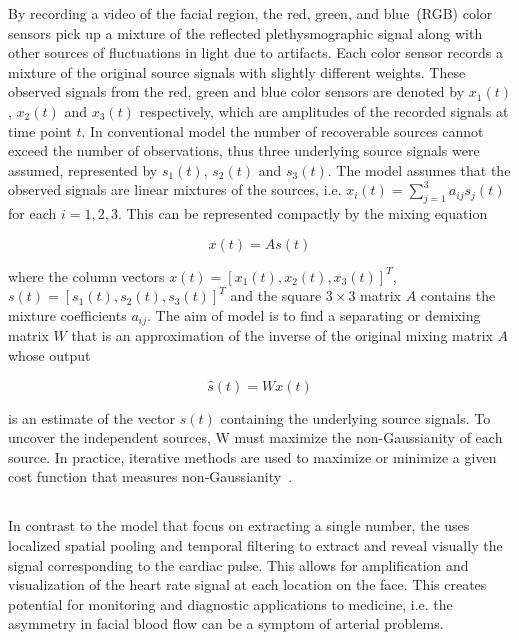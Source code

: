 By recording a video of
the facial region, the red, green, and blue~(RGB) color sensors pick up a
mixture of the reflected plethysmographic signal along with other sources of
fluctuations in light due to artifacts. Each color sensor records a mixture
of the original source signals with slightly different weights. These observed
signals from the red, green and blue color sensors are denoted by $x_{1}(t)$,
$x_{2}(t)$ and $x_{3}(t)$ respectively, which are amplitudes of the recorded
signals at time point $t$. In conventional \ica{} model the number of
recoverable sources cannot exceed the number of observations, thus three
underlying source signals were assumed, represented by $s_{1}(t)$, $s_{2}(t)$
and $s_{3}(t)$. The \ica{} model assumes that the observed signals are linear
mixtures of the sources, i.e. $x_{i}(t) = \sum_{j=1}^{3} a_{ij} s_{j}(t)$ for
each $i=1,2,3$. This can be represented compactly by the mixing equation

\begin{equation}
  x(t) = As(t)
\end{equation}

where the column vectors $x(t) = [x_{1}(t), x_{2}(t), x_{3}(t)]^{T}$,
$s(t) = [s_{1}(t), s_{2}(t), s_{3}(t)]^{T}$ and the square $3\times3$
matrix $A$ contains the mixture coefficients $a_{ij}$. The aim of \ica{} model
is to find a separating or demixing matrix $W$ that is an approximation of the
inverse of the original mixing matrix $A$ whose output

\begin{equation}
  \hat{s}(t) = Wx(t)
\end{equation}

is an estimate of the vector $s(t)$ containing the underlying source signals.
To uncover the independent sources, W must maximize the non-Gaussianity of
each source. In practice, iterative methods are used to maximize or minimize
a given cost function that measures non-Gaussianity~\cite{Poh2010Non,
Poh2011Advancements}.

\subsection{\evm} \label{sec:sota:post:evm}


In contrast to the \ica{} model that focus on extracting a single number,
the \evm{} uses localized spatial pooling and temporal filtering to extract
and reveal visually the signal corresponding to the cardiac pulse. This
allows for amplification and visualization of the heart rate signal at each
location on the face. This creates potential for monitoring and diagnostic
applications to medicine, i.e. the asymmetry in facial blood flow can be a
symptom of arterial problems.


